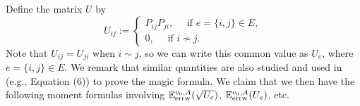 \documentclass[a4paper, 11pt]{article}
\newcommand{\E}{\mathbb{E}}
\newcommand{\Eerrw}{\E_{\textnormal{errw}}}
\begin{document}
Define the matrix $U$ by
\begin{equation}        \label{eqn:udefinition}
U_{ij} :=
\begin{cases} 
 P_{ij}P_{ji}, \quad \text{ if } e =\{i,j\} \in E,\\
 0, \quad \text{ if } i \nsim j.
\end{cases}
\end{equation}
Note that $U_{ij} = U_{ji}$ when $i \sim j$,
so we can write this common value as $U_e$, where
$e = \{i,j\} \in E$.
We remark that similar quantities are also studied and used 
in~\cite{mr2} (e.g., Equation (6)) to prove the magic formula. 
We claim that we then have the following moment formulas involving $\Eerrw^{v_0,A} (\sqrt{U_e})$, $\Eerrw^{v_0,A} (U_e)$, etc. 
\end{document}
